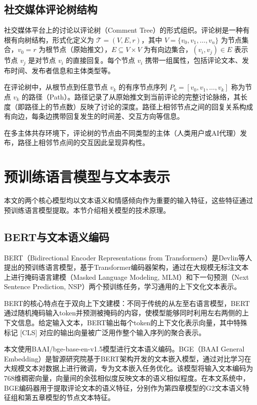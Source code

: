 \subsection{社交媒体评论树结构}

社交媒体平台上的讨论以评论树（Comment Tree）的形式组织。评论树是一种有根有向树结构，形式化定义为 $\mathcal{T} = (V, E, r)$，其中 $V = \{v_0, v_1, \ldots, v_n\}$ 为节点集合，$v_0 = r$ 为根节点（原始推文），$E \subseteq V \times V$ 为有向边集合，$(v_i, v_j) \in E$ 表示节点 $v_j$ 是对节点 $v_i$ 的直接回复。每个节点 $v_i$ 携带一组属性，包括评论文本、发布时间、发布者信息和主体类型等。


在评论树中，从根节点到任意节点 $v_k$ 的有序节点序列 $P_k = [v_0, v_1, \ldots, v_k]$ 称为节点 $v_k$ 的路径（Path）。路径记录了从原始推文到当前评论的完整讨论脉络，其长度（即路径上的节点数）反映了讨论的深度。路径上相邻节点之间的回复关系构成有向边，每条边携带回复发生的时间差、交互方向等信息。

在多主体共存环境下，评论树的节点由不同类型的主体（人类用户或AI代理）发布，路径上相邻节点间的交互因此呈现异构性。

\section{预训练语言模型与文本表示}

本文的两个核心模型均以文本语义和情感倾向作为重要的输入特征，这些特征通过预训练语言模型提取。本节介绍相关模型的技术原理。

\subsection{BERT与文本语义编码}

BERT（Bidirectional Encoder Representations from Transformers）是Devlin等人\cite{devlin2019bert}提出的预训练语言模型，基于Transformer编码器架构，通过在大规模无标注文本上进行掩码语言建模（Masked Language Modeling, MLM）和下一句预测（Next Sentence Prediction, NSP）两个预训练任务，学习通用的上下文化文本表示。

BERT的核心特点在于双向上下文建模：不同于传统的从左至右语言模型，BERT通过随机掩码输入token并预测被掩码的内容，使模型能够同时利用左右两侧的上下文信息。给定输入文本，BERT输出每个token的上下文化表示向量，其中特殊标记 {[CLS]} 对应的输出向量被广泛用作整个输入序列的聚合表示。

本文使用BAAI/bge-base-en-v1.5模型进行文本语义编码。BGE（BAAI General Embedding）是智源研究院基于BERT架构开发的文本嵌入模型\cite{xiao2024cpack}，通过对比学习在大规模文本对数据上进行微调，专为文本嵌入任务优化。该模型将输入文本编码为768维稠密向量，向量间的余弦相似度反映文本的语义相似程度。在本文系统中，BGE编码器用于提取评论文本的语义特征，分别作为第四章模型的G2文本语义特征组和第五章模型的节点文本特征。

